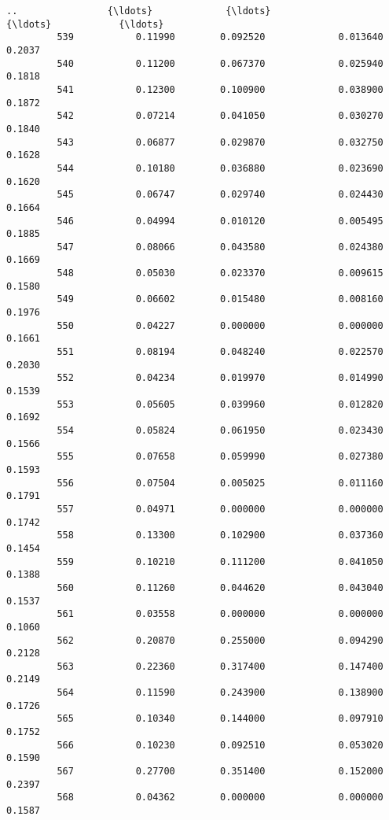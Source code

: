 \documentclass[11pt]{article}
\begin{document}
\begin{Verbatim}[commandchars=\\\{\}]
         ..                {\ldots}             {\ldots}                  {\ldots}            {\ldots}   
         539           0.11990        0.092520             0.013640         0.2037   
         540           0.11200        0.067370             0.025940         0.1818   
         541           0.12300        0.100900             0.038900         0.1872   
         542           0.07214        0.041050             0.030270         0.1840   
         543           0.06877        0.029870             0.032750         0.1628   
         544           0.10180        0.036880             0.023690         0.1620   
         545           0.06747        0.029740             0.024430         0.1664   
         546           0.04994        0.010120             0.005495         0.1885   
         547           0.08066        0.043580             0.024380         0.1669   
         548           0.05030        0.023370             0.009615         0.1580   
         549           0.06602        0.015480             0.008160         0.1976   
         550           0.04227        0.000000             0.000000         0.1661   
         551           0.08194        0.048240             0.022570         0.2030   
         552           0.04234        0.019970             0.014990         0.1539   
         553           0.05605        0.039960             0.012820         0.1692   
         554           0.05824        0.061950             0.023430         0.1566   
         555           0.07658        0.059990             0.027380         0.1593   
         556           0.07504        0.005025             0.011160         0.1791   
         557           0.04971        0.000000             0.000000         0.1742   
         558           0.13300        0.102900             0.037360         0.1454   
         559           0.10210        0.111200             0.041050         0.1388   
         560           0.11260        0.044620             0.043040         0.1537   
         561           0.03558        0.000000             0.000000         0.1060   
         562           0.20870        0.255000             0.094290         0.2128   
         563           0.22360        0.317400             0.147400         0.2149   
         564           0.11590        0.243900             0.138900         0.1726   
         565           0.10340        0.144000             0.097910         0.1752   
         566           0.10230        0.092510             0.053020         0.1590   
         567           0.27700        0.351400             0.152000         0.2397   
         568           0.04362        0.000000             0.000000         0.1587   
         

\end{Verbatim}
\end{document}

